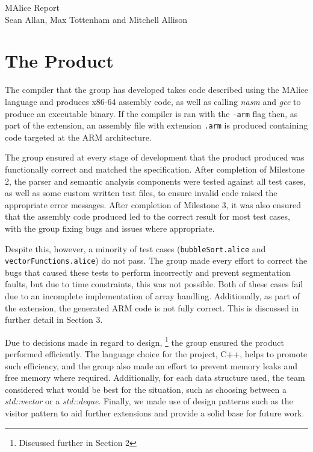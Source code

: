 \documentclass[a4wide, 11pt]{article}
\begin{document}
\begin{center}
{\huge MAlice Report} \\ [0.4cm]
{\large Sean Allan, Max Tottenham and Mitchell Allison} \\ [0.2cm]
\vspace{1cm}
\end{center}

\section{The Product}
The compiler that the group has developed takes code described using the MAlice language
and produces x86-64 assembly code, as well as calling \emph{nasm} and \emph{gcc}
to produce an executable binary. If the compiler is ran with the \texttt{-arm} 
flag then, as part of the extension, an assembly file with extension 
\texttt{.arm} is produced containing code targeted at the ARM architecture.

The group ensured at every stage of development that the product produced
was functionally correct and matched the specification. After completion of
Milestone 2, the parser and semantic analysis components were tested against
all test cases, as well as some custom written test files, to ensure invalid
code raised the appropriate error messages. After completion of Milestone 3, it
was also ensured that the assembly code produced led to the correct result 
for most test cases, with the group fixing bugs and issues where appropriate.

Despite this, however, a minority of test cases 
(\texttt{bubbleSort.alice} and \texttt{vectorFunctions.alice}) do
not pass. The group made every effort to correct the bugs that caused these
tests to perform incorrectly and prevent segmentation faults, but due to time
constraints, this was not possible. Both of these cases fail due to an 
incomplete implementation of array handling. Additionally, as part of the
extension, the generated ARM code is not fully correct. This is discussed
in further detail in Section 3.

Due to decisions made in regard to design, \footnote{Discussed further in
Section 2} the group ensured the product performed efficiently. The language
choice for the project, C++, helps to promote such efficiency, and the group
also made an effort to prevent memory leaks and free memory where required. 
Additionally, for each data structure used, the team considered what would be
best for the situation, such as choosing between a \emph{std::vector} or a
\emph{std::deque}. Finally, we made use of design patterns such as the visitor
pattern to aid further extensions and provide a solid base for future work.
\end{document}
